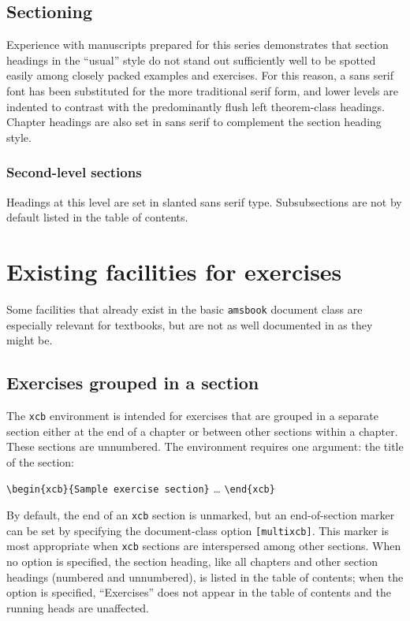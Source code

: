 \documentclass[multixcb]{amstext-l}
\theoremstyle{plain}
\theoremstyle{definition}
\newcommand{\cls}[1]{\texttt{#1}}
\newcommand{\env}[1]{\texttt{#1}}
\newcommand{\opt}[1]{\texttt{[#1]}}
\newenvironment{exm}{%
  \par
  \begingroup
    \parindent0pt
    \leftskip2\normalparindent
    \obeylines
}{%
    \par
  \endgroup
}
\begin{document}
\subsection{Sectioning}

Experience with manuscripts prepared for this series
demonstrates that section headings in the ``usual'' style do not
stand out sufficiently well to be spotted easily among closely
packed examples and exercises.  For this reason, a sans serif font
has been substituted for the more traditional serif form, and lower
levels are indented to contrast with the predominantly flush left
theorem-class headings.  Chapter headings are also set in sans serif
to complement the section heading style.

\subsubsection{Second-level sections}

Headings at this level are set in slanted sans serif type.
Subsubsections are not by default listed in the table of contents.

\section{Existing facilities for exercises}

Some facilities that already exist in the basic \cls{amsbook}
document class are especially relevant for textbooks, but are not
as well documented in \cite{HANDBK} as they might be.

\subsection{Exercises grouped in a section}

The \env{xcb} environment is intended for exercises that are
grouped in a separate section either at the end of a chapter or
between other sections within a chapter.  These sections are
unnumbered.  The environment requires one argument: the title of
the section:
\begin{exm}
\verb+\begin{xcb}{Sample exercise section}+
\dots
\verb+\end{xcb}+
\end{exm}
\noindent
By default, the end of an \env{xcb} section is unmarked, but
an end-of-section marker can be set by specifying the document-class
option \opt{multixcb}.  This marker is most appropriate when
\env{xcb} sections are interspersed among other sections.  When
no option is specified, the section heading, like all chapters and
other section headings (numbered and unnumbered), is listed in the
table of contents; when the option is specified, ``Exercises'' does
not appear in the table of contents and the running heads are
unaffected.
\end{document}
